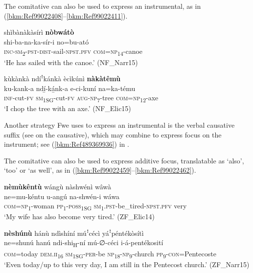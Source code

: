 The comitative can also be used to express an instrumental, as in (\ref{bkm:Ref99022408}--\ref{bkm:Ref99022411}).

\ea
\label{bkm:Ref99022408}
shìbànàkàsírì \textbf{nòbwátò}\\
\gll shi-ba-na-ka-sír-i      no=bu-ató\\
\textsc{inc}-\textsc{sm}\textsubscript{2}-\textsc{pst}-\textsc{dist}-sail-\textsc{npst}.\textsc{pfv}  \textsc{com}=\textsc{np}\textsubscript{14}-canoe\\
\glt ‘He has sailed with the canoe.’ (NF\_Narr15)
\z

\ea
\label{bkm:Ref99022411}
kùkànkà ndíꜝkánkà ècìkúnì \textbf{nàkàtêmù}\\
\gll ku-kank-a  ndí̲-ká̲nk-a  e-ci-kuní    na=ka-tému\\
\textsc{inf}-cut-\textsc{fv}  \textsc{sm}\textsubscript{1SG}-cut-\textsc{fv}  \textsc{aug}-\textsc{np}\textsubscript{7}-tree  \textsc{com}=\textsc{np}\textsubscript{12}-axe\\
\glt ‘I chop the tree with an axe.’ (NF\_Elic15)
\z

Another strategy Fwe uses to express an instrumental is the verbal causative suffix (see  on the causative), which may combine to express focus on the instrument; see (\ref{bkm:Ref489369936}) in .

The comitative can also be used to express additive focus, translatable as ‘also’, ‘too’ or ‘as well’, as in (\ref{bkm:Ref99022459}--\ref{bkm:Ref99022462}).

\ea
\label{bkm:Ref99022459}
\textbf{nèmùkêntù} wángù nàshwénì wâwà\\
\gll ne=mu-kéntu  u-angú  na-shwén-i        wáwa\\
\textsc{com}=\textsc{np}\textsubscript{1}-woman  \textsc{pp}\textsubscript{1}-\textsc{poss}\textsubscript{1SG}  \textsc{sm}\textsubscript{1}.\textsc{pst}-be\_tired-\textsc{npst}.\textsc{pfv}  very\\
\glt ‘My wife has also become very tired.’ (ZF\_Elic14)
\z

\ea
\label{bkm:Ref99022462}
\textbf{nèshúnù} hánù ndìshíní múꜝcécì yáꜝpéntékòsítì\\
\gll ne=shunú  hanú    ndi-shi\textsubscript{H}-ní  mú-∅-céci  i-á-pentékosití \\
\textsc{com}=today  \textsc{dem}.\textsc{ii}\textsubscript{16}  \textsc{sm}\textsubscript{1SG}-\textsc{per}-be  \textsc{np}\textsubscript{18}-\textsc{np}\textsubscript{9}-church \textsc{pp}\textsubscript{9}-\textsc{con}=Pentecoste\\
\glt ‘Even today/up to this very day, I am still in the Pentecost church.’ (ZF\_Narr15)
\z

